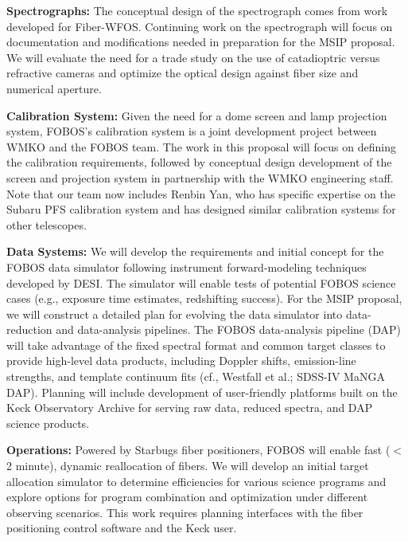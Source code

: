 
\noindent \textbf{Spectrographs:} The conceptual design of the
spectrograph comes from work developed for Fiber-WFOS. Continuing
work on the spectrograph will focus on documentation and
modifications needed in preparation for the MSIP proposal. We will
evaluate the need for a trade study on the use of catadioptric versus
refractive cameras and optimize the optical design against fiber size
and numerical aperture.

\noindent \textbf{Calibration System:} Given the need for a dome
screen and lamp projection system, FOBOS's calibration system is a
joint development project between WMKO and the FOBOS team. The work
in this proposal will focus on defining the calibration requirements,
followed by conceptual design development of the screen and
projection system in partnership with the WMKO engineering staff.
Note that our team now includes Renbin Yan, who has specific
expertise on the Subaru PFS calibration system and has designed
similar calibration systems for other telescopes.


\noindent \textbf{Data Systems:} We will develop the requirements and
initial concept for the FOBOS data simulator following instrument
forward-modeling techniques developed by DESI. The simulator will
enable tests of potential FOBOS science cases (e.g., exposure time
estimates, redshifting success). For the MSIP proposal, we will
construct a detailed plan for evolving the data simulator into
data-reduction and data-analysis pipelines. The FOBOS data-analysis
pipeline (DAP) will take advantage of the fixed spectral format and
common target classes to provide high-level data products, including
Doppler shifts, emission-line strengths, and template continuum fits
(cf., Westfall et al.; SDSS-IV MaNGA DAP). Planning will include
development of user-friendly platforms built on the Keck Observatory
Archive for serving raw data, reduced spectra, and DAP science
products.

\noindent \textbf{Operations:} Powered by Starbugs fiber positioners,
FOBOS will enable fast ($<$2 minute), dynamic reallocation of fibers. We will
develop an initial target allocation simulator to determine
efficiencies for various science programs and explore options for
program combination and optimization under different observing
scenarios. This work requires planning interfaces with the fiber
positioning control software and the Keck user.

